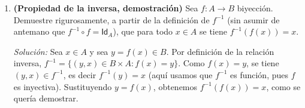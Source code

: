 \documentclass[11pt]{article}
\begin{document}
\begin{enumerate}[label=\arabic*.]
\textit{Solución:} Para $x\ge0$, $f(x)=x^2+1$ es estrictamente creciente y recorre $[1,\infty[$.
Para $x<0$, $f(x)=2x+1$ es estrictamente creciente y recorre $\,]-\infty,1[$. Como los recorridos
de ambos tramos no se traslapan (uno es $\ge1$ y el otro $<1$) y cada tramo es inyectivo por
separado, $f$ es inyectiva en $\mathbb{R}$. Además $\mathsf{Rec}\,f =
[1,\infty[\,\cup\,]-\infty,1[ = \mathbb{R}$, así que $f$ es sobre. Luego $f$ es biyección de
$\mathbb{R}$ sobre $\mathbb{R}$, con
$$f^{-1}(y) = \begin{cases} \sqrt{y-1} & \text{si } y\ge1 \\ \dfrac{y-1}{2} & \text{si } y<1.
\end{cases}$$

\item \textbf{(Propiedad de la inversa, demostración)} Sea $f:A\to B$ biyección. Demuestre
rigurosamente, a partir de la definición de $f^{-1}$ (sin asumir de antemano que
$f^{-1}\circ f=\mathsf{Id}_A$), que para todo $x\in A$ se tiene $f^{-1}(f(x)) = x$.

\textit{Solución:} Sea $x\in A$ y sea $y=f(x)\in B$. Por definición de la relación inversa,
$f^{-1} = \{(y,x)\in B\times A : f(x)=y\}$. Como $f(x)=y$, se tiene $(y,x)\in f^{-1}$, es decir
$f^{-1}(y)=x$ (aquí usamos que $f^{-1}$ es función, pues $f$ es inyectiva). Sustituyendo $y=f(x)$,
obtenemos $f^{-1}(f(x)) = x$, como se quería demostrar.

\end{enumerate}
\end{document}
